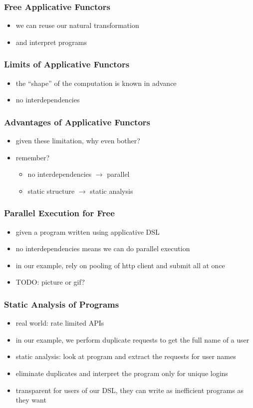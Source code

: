 \documentclass[compress]{beamer}
\begin{document}
\begin{frame}
  \frametitle{Free Applicative Functors}
  \begin{itemize}
  \item we can reuse our natural transformation
  \item and interpret programs
  \end{itemize}
\end{frame}

\begin{frame}
  \frametitle{Limits of Applicative Functors}
  \begin{itemize}
  \item the ``shape'' of the computation is known in advance
  \item no interdependencies
  \end{itemize}
\end{frame}

\begin{frame}
  \frametitle{Advantages of Applicative Functors}
  \begin{itemize}
  \item given these limitation, why even bother?
  \item remember?
    \begin{itemize}
    \item no interdependencies $\rightarrow$ parallel
    \item static structure $\rightarrow$ static analysis
    \end{itemize}
  \end{itemize}
\end{frame}

\begin{frame}
  \frametitle{Parallel Execution for Free}
  \begin{itemize}
  \item given a program written using applicative DSL
  \item no interdependencies means we can do parallel execution
  \item in our example, rely on pooling of http client and submit all
    at once
  \item TODO: picture or gif?
  \end{itemize}
\end{frame}

\begin{frame}
  \frametitle{Static Analysis of Programs}
  \begin{itemize}
  \item real world: rate limited APIs
  \item in our example, we perform duplicate requests to get the full
    name of a user
  \item static analysis: look at program and extract the requests for
    user names
  \item eliminate duplicates and interpret the program only for unique
    logins
  \item transparent for users of our DSL, they can write as
    inefficient programs as they want
  \end{itemize}
\end{frame}
\end{document}

